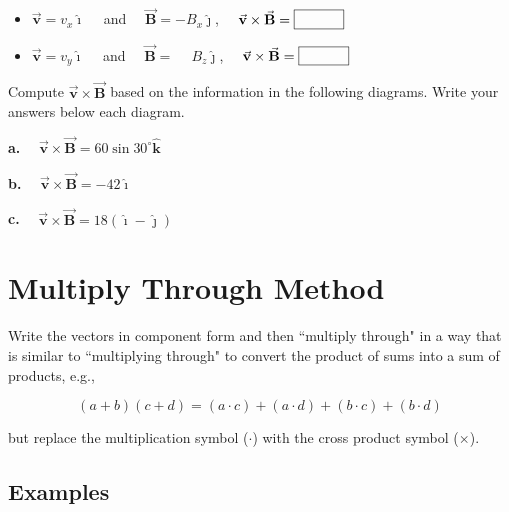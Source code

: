 \documentclass{article}
\newcommand{\ihat}[0]{\hat{\boldsymbol{\imath}}}
\newcommand{\jhat}[0]{\hat{\boldsymbol{\jmath}}}
\newcommand{\khat}[0]{\hat{\boldsymbol{k}}}
\newcommand{\bfvec}[1]{\vec{\mathbf{#1}}}
\begin{document}
\vskip 60pt

    \begin{itemize}

      \item $\bfvec{v}=v_x\ihat\quad$ and $\quad\bfvec{B}=-B_x\jhat$, $\quad\bfvec{v}\times\bfvec{B} = \fbox{\qquad\phantom M}$

    \end{itemize}

\vskip 60pt

    \begin{itemize}

      \item $\bfvec{v}=v_y\ihat\quad$ and $\quad\bfvec{B}=\phantom{-}B_z\jhat$, $\quad\bfvec{v}\times\bfvec{B} = \fbox{\qquad\phantom M}$

    \end{itemize}
\fi

\vskip 36pt

\vskip 0.75pt

Compute $\bfvec{v}\times\bfvec{B}$ based on the information in the following diagrams. Write your answers below each diagram.



\ifsolutions
\textbf{a.}
$\quad\bfvec{v}\times\bfvec{B} = 60\sin 30^\circ\khat$

\textbf{b.} $\quad\bfvec{v}\times\bfvec{B}=-42\ihat$

\textbf{c.} $\quad\bfvec{v}\times\bfvec{B} = 18(\ihat - \jhat)$
\else

\newpage
\fi

\section{Multiply Through Method}

Write the vectors in component form and then ``multiply through" in a way that is similar to ``multiplying through" to convert the product of sums into a sum of products, e.g.,

$$(a+b)(c+d)=(a\cdot c) + (a\cdot d) + (b\cdot c) + (b\cdot d)$$

but replace the multiplication symbol ($\cdot$) with the cross product symbol ($\times$).

\subsection{Examples}
\end{document}
